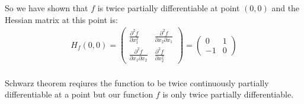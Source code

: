 \documentclass{article}
\begin{document}
So we have shown that \(f\) is twice partially differentiable at point \((0,0)\) and the Hessian matrix at this point is:
\begin{align*}
   H_f(0,0) = \begin{pmatrix}
      \frac{\partial^2 f}{\partial x_1^2} & \frac{\partial^2 f}{\partial x_2 \partial x_1} \\
      \frac{\partial^2 f}{\partial x_1 \partial x_2} & \frac{\partial^2 f}{\partial x_2^2}
   \end{pmatrix} = \begin{pmatrix}
      0 & 1 \\
      -1 & 0
   \end{pmatrix}
\end{align*}
\\
Schwarz theorem reqiures the function to be twice continuously partially differentiable at a point but our function \(f\) is only twice partially differentiable.
\end{document}
